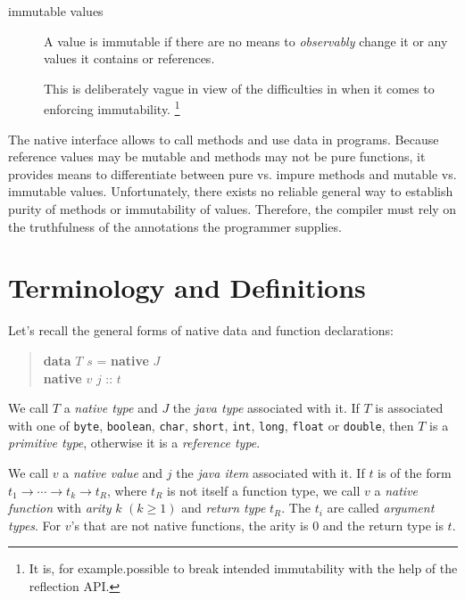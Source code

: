 \begin{description}
\item[immutable values] A value is immutable if there are no means to \emph{observably} change it or any values it contains or references.

This is deliberately vague in view of the difficulties in \java{} when it comes to enforcing immutability. \footnote{It is, for example.possible to break intended immutability with the help of  the reflection API.}
\end{description}

The native interface allows to call \java{} methods and use \java{} data in \frege{} programs.
Because \java{} reference values  may be mutable and \java{} methods may not be pure functions, it provides means to differentiate between pure vs. impure methods and mutable vs. immutable values. Unfortunately, there exists no reliable general way to establish purity of \java{} methods or immutability of \java{} values. Therefore, the \frege{} compiler must rely on the truthfulness of the annotations the programmer supplies.



\section{Terminology and Definitions}

Let's recall the general forms of native data and function declarations:
\begin{quote}
\begin{flushleft}
\textbf{data} $T$ $s$ = \textbf{native} $J$\\
\textbf{native} $v$ $j$ :: $t$
\end{flushleft}
\end{quote}

We call $T$ a \emph{native type} and $J$ the \emph{java type} associated with it. If $T$ is associated with one of \texttt{byte}, \texttt{boolean}, \texttt{char}, \texttt{short}, \texttt{int}, \texttt{long}, \texttt{float} or \texttt{double}, then $T$ is a \emph{primitive type}, otherwise it is a  \emph{reference type}.

We call $v$ a \emph{native value} and $j$ the \emph{java item} associated with it. If $t$ is of the form $t_1 \rightarrow{} \cdots{} \rightarrow{} t_k \rightarrow{}t_R$, where $t_R$ is not itself a function type, we call $v$ a \emph{native function} with \emph{arity} $k$ $(k\ge 1)$ and \emph{return type} $t_R$. The $t_i$ are called \emph{argument types}. For $v$'s that are not native functions, the arity is 0 and the return type is $t$.

